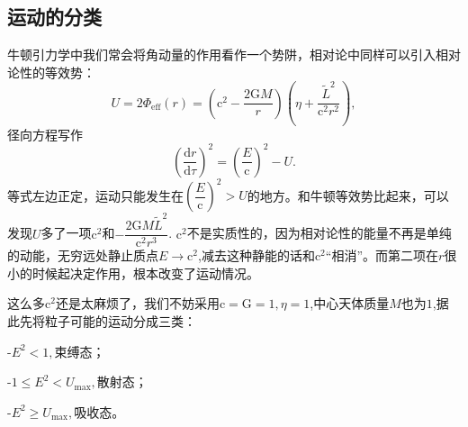 \documentclass[11pt, a4paper, oneside, onecolumn]{ctexart}
\numberwithin{equation}{subsection}
\begin{document}
\subsection{运动的分类}
牛顿引力学中我们常会将角动量的作用看作一个势阱，相对论中同样可以引入相对论性的等效势：
\begin{equation}
U=2\Phi_{\text{eff}}\left(r\right)=\left(\mathrm{c}^{2}-\frac{2\mathrm{G}M}{r}\right)\left(\eta+\frac{\widetilde{L}^{2}}{\mathrm{c}^{2}r^{2}}\right),
\end{equation}
径向方程写作
\begin{equation}
\left(\frac{\mathrm{d}r}{\mathrm{d}\tau}\right)^{2}=\left(\frac{E}{\mathrm{c}}\right)^{2}-U.
\end{equation}
等式左边正定，运动只能发生在$\left(\dfrac{E}{\mathrm{c}}\right)^{2}>U$的地方。和牛顿等效势比起来，可以发现$U$多了一项$\mathrm{c}^{2}$和$-\dfrac{2\mathrm{G}M\widetilde{L}^{2}}{\mathrm{c}^{2}r^{3}}$. $\mathrm{c}^{2}$不是实质性的，因为相对论性的能量不再是单纯的动能，无穷远处静止质点$E\to \mathrm{c}^{2}$,减去这种静能的话和$\mathrm{c}^{2}$“相消”。而第二项在$r$很小的时候起决定作用，根本改变了运动情况。

这么多$\mathrm{c}^{2}$还是太麻烦了，我们不妨采用$\mathrm{c}=\mathrm{G}=1,\eta=1$,中心天体质量$M$也为$1$,据此先将粒子可能的运动分成三类：

\quad-\quad $E^{2}<1,$束缚态；

\quad-\quad $1\le E^{2}<U_{\max},$散射态；

\quad-\quad $E^{2}\ge U_{\max},$吸收态。
\end{document}
